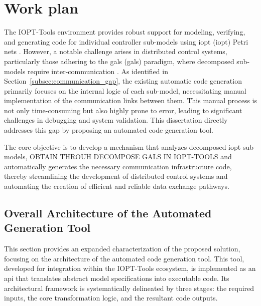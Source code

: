
%

\chapter{Work plan}
\label{cha:work_plan}



 The IOPT-Tools environment provides robust support for modeling, verifying, and generating code for individual controller sub-models using \gls{iopt} (\gls{iopt}) Petri nets \cite{iopttools, barros2004, RefiningIOPT}. However, a notable challenge arises in distributed control systems, particularly those adhering to the \gls{gals} (\gls{gals}) paradigm, where decomposed sub-models require inter-communication \cite{galsactd, Barrosadd}. As identified in Section~\ref{subsec:communication_gap}, the existing automatic code generation primarily focuses on the internal logic of each sub-model, necessitating manual implementation of the communication links between them. This manual process is not only time-consuming but also highly prone to error, leading to significant challenges in debugging and system validation. This dissertation directly addresses this gap by proposing an automated code generation tool.
 
 The core objective is to develop a mechanism that analyzes decomposed \gls{iopt} sub-models, OBTAIN THROUH DECOMPOSE GALS IN IOPT-TOOLS and automatically generates the necessary communication infrastructure code, thereby streamlining the development of distributed control systems and automating the creation of efficient and reliable data exchange pathways.
 
 
\section{Overall Architecture of the Automated Generation Tool}
\label{sec:overall_architecture}

This section provides an expanded characterization of the proposed solution, focusing on the architecture of the automated code generation tool. This tool, developed for integration within the IOPT-Tools ecosystem, is implemented as an \gls{api} that translates abstract model specifications into executable code. Its architectural framework is systematically delineated by three stages: the required inputs, the core transformation logic, and the resultant code outputs.

